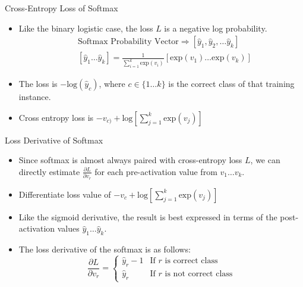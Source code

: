 \begin{frame}{Cross-Entropy Loss of Softmax}
\begin{itemize}
\item Like the binary logistic case, the loss $L$ is a negative log
probability.
\begin{align*}
& \mbox{Softmax Probability Vector} \Rightarrow [\hat{y}_1, \hat{y}_2, \ldots \hat{y}_k]\\
& [\hat{y}_1 \ldots \hat{y}_k]= \frac{1}{\sum_{i=1}^k
\mbox{exp}(v_i)} \left[ \mbox{exp}(v_1) \ldots \mbox{exp}(v_k)
\right]
\end{align*}
 \item The loss is  $-\mbox{log}(\hat{y}_c)$, where $c \in \{
1 \ldots k \}$ is the correct class of that training instance.
\item Cross entropy loss is  $ -v_{c)} + \mbox{log}[\sum_{j=1}^k
\mbox{exp}(v_j)]$
\end{itemize}
\end{frame}


\begin{frame}{Loss Derivative of Softmax}
\begin{itemize}
\item Since softmax is almost always paired with cross-entropy loss
$L$, we can directly estimate $\frac{\partial L}{\partial v_r}$ for
each pre-activation value from $v_1 \ldots v_k$.
\item  Differentiate loss value of  $ -v_{c} + \mbox{log}[\sum_{j=1}^k
\mbox{exp}(v_j)]$
\item Like the sigmoid derivative, the result is best expressed in
terms of the post-activation values $\hat{y}_1 \ldots \hat{y}_k$.
\item The  loss derivative of the softmax is as follows:
\begin{equation*}
\frac{\partial L}{\partial v_r}= \begin{cases} \hat{y}_r -1 &
\mbox{If $r$ is
correct class}\\
\hat{y}_r & \mbox{If $r$ is not correct class}
\end{cases}
\end{equation*}
\end{itemize}
\end{frame}


